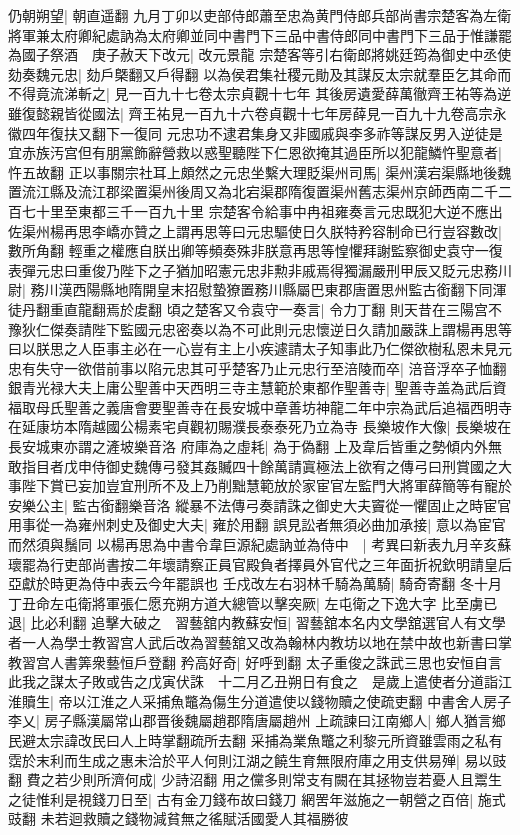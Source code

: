 仍朝朔望|{
	朝直遥翻}
九月丁卯以吏部侍郎蕭至忠為黄門侍郎兵部尚書宗楚客為左衛將軍兼太府卿紀處訥為太府卿並同中書門下三品中書侍郎同中書門下三品于惟謙罷為國子祭酒　庚子赦天下改元|{
	改元景龍}
宗楚客等引右衛郎將姚廷筠為御史中丞使劾奏魏元忠|{
	劾戶槩翻又戶得翻}
以為侯君集社稷元勛及其謀反太宗就羣臣乞其命而不得竟流涕斬之|{
	見一百九十七卷太宗貞觀十七年}
其後房遺愛薛萬徹齊王祐等為逆雖復懿親皆從國法|{
	齊王祐見一百九十六卷貞觀十七年房薛見一百九十九卷高宗永徽四年復扶又翻下一復同}
元忠功不逮君集身又非國戚與李多祚等謀反男入逆徒是宜赤族汚宫但有朋黨飾辭營救以惑聖聽陛下仁恩欲掩其過臣所以犯龍鱗忤聖意者|{
	忤五故翻}
正以事關宗社耳上頗然之元忠坐繫大理貶渠州司馬|{
	渠州漢宕渠縣地後魏置流江縣及流江郡梁置渠州後周又為北宕渠郡隋復置渠州舊志渠州京師西南二千二百七十里至東都三千一百九十里}
宗楚客令給事中冉祖雍奏言元忠既犯大逆不應出佐渠州楊再思李嶠亦贊之上謂再思等曰元忠驅使日久朕特矜容制命已行豈容數改|{
	數所角翻}
輕重之權應自朕出卿等頻奏殊非朕意再思等惶懼拜謝監察御史袁守一復表彈元忠曰重俊乃陛下之子猶加昭憲元忠非勲非戚焉得獨漏嚴刑甲辰又貶元忠務川尉|{
	務川漢西陽縣地隋開皇末招慰蟄獠置務川縣屬巴東郡唐置思州監古銜翻下同渾徒丹翻重直龍翻焉於䖍翻}
頃之楚客又令袁守一奏言|{
	令力丁翻}
則天昔在三陽宫不豫狄仁傑奏請陛下監國元忠密奏以為不可此則元忠懷逆日久請加嚴誅上謂楊再思等曰以朕思之人臣事主必在一心豈有主上小疾遽請太子知事此乃仁傑欲樹私恩未見元忠有失守一欲借前事以陷元忠其可乎楚客乃止元忠行至涪陵而卒|{
	涪音浮卒子恤翻}
銀青光禄大夫上庸公聖善中天西明三寺主慧範於東都作聖善寺|{
	聖善寺盖為武后資福取母氏聖善之義唐會要聖善寺在長安城中章善坊神龍二年中宗為武后追福西明寺在延康坊本隋越國公楊素宅貞觀初賜濮長泰泰死乃立為寺}
長樂坡作大像|{
	長樂坡在長安城東亦謂之滻坡樂音洛}
府庫為之虛耗|{
	為于偽翻}
上及韋后皆重之勢傾内外無敢指目者戊申侍御史魏傳弓發其姦贓四十餘萬請寘極法上欲宥之傳弓曰刑賞國之大事陛下賞已妄加豈宜刑所不及上乃削黜慧範放於家宦官左監門大將軍薛簡等有寵於安樂公主|{
	監古銜翻樂音洛}
縱暴不法傳弓奏請誅之御史大夫竇從一懼固止之時宦官用事從一為雍州刺史及御史大夫|{
	雍於用翻}
誤見訟者無須必曲加承接|{
	意以為宦官而然須與鬚同}
以楊再思為中書令韋巨源紀處訥並為侍中　|{
	考異曰新表九月辛亥蘇瓌罷為行吏部尚書按二年壞請察正員官殿負者擇員外官代之三年面折祝欽明請皇后亞獻於時更為侍中表云今年罷誤也}
壬戍改左右羽林千騎為萬騎|{
	騎奇寄翻}
冬十月丁丑命左屯衛將軍張仁愿充朔方道大總管以擊突厥|{
	左屯衛之下逸大字}
比至虜已退|{
	比必利翻}
追擊大破之　習藝舘内教蘇安恒|{
	習藝舘本名内文學舘選官人有文學者一人為學士教習宫人武后改為習藝舘又改為翰林内教坊以地在禁中故也新書曰掌教習宫人書筭衆藝恒戶登翻}
矜高好奇|{
	好呼到翻}
太子重俊之誅武三思也安恒自言此我之謀太子敗或告之戊寅伏誅　十二月乙丑朔日有食之　是歲上遣使者分道詣江淮贖生|{
	帝以江淮之人采捕魚鼈為傷生分道遣使以錢物贖之使疏吏翻}
中書舍人房子李乂|{
	房子縣漢屬常山郡晋後魏屬趙郡隋唐屬趙州}
上疏諫曰江南鄉人|{
	鄉人猶言鄉民避太宗諱改民曰人上時掌翻疏所去翻}
采捕為業魚鼈之利黎元所資雖雲雨之私有霑於末利而生成之惠未洽於平人何則江湖之饒生育無限府庫之用支供易殚|{
	易以豉翻}
費之若少則所濟何成|{
	少詩沼翻}
用之儻多則常支有闕在其拯物豈若憂人且鬻生之徒惟利是視錢刀日至|{
	古有金刀錢布故曰錢刀}
網罟年滋施之一朝營之百倍|{
	施式豉翻}
未若迴救贖之錢物減貧無之徭賦活國愛人其福勝彼

